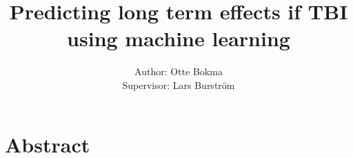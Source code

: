 \documentclass[11pt]{article}
\title{Predicting long term effects if TBI using machine learning}
\author{Author: Otte Bokma\\
Supervisor: Lars Burström}
\begin{document}
\begin{titlepage}
\maketitle
\end{titlepage}

\section*{Abstract}
\end{document}

